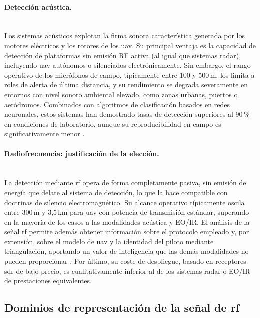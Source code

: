 \paragraph{Detección acústica.}\mbox{}\\[0.5em] Los sistemas acústicos explotan la firma sonora característica generada por los motores eléctricos y los rotores de los \gls{uav}. Su principal ventaja es la capacidad de detección de plataformas sin emisión RF activa (al igual que sistemas radar), incluyendo \gls{uav} autónomos o silenciados electrónicamente. Sin embargo, el rango operativo de los micrófonos de campo, típicamente entre 100 y 500\,m, los limita a roles de alerta de última distancia, y su rendimiento se degrada severamente en entornos con nivel sonoro ambiental elevado, como zonas urbanas, puertos o aeródromos. Combinados con algoritmos de clasificación basados en redes neuronales, estos sistemas han demostrado tasas de detección superiores al 90\,\% en condiciones de laboratorio, aunque su reproducibilidad en campo es significativamente menor \cite{he_multimodal_2025}.

\paragraph{Radiofrecuencia: justificación de la elección.}\mbox{}\\[0.5em]
La detección mediante \gls{rf} opera de forma completamente pasiva, sin emisión de energía que delate al sistema de detección, lo que la hace compatible con doctrinas de silencio electromagnético. Su alcance operativo típicamente oscila entre 300\,m y 3,5\,km para \gls{uav} con potencia de transmisión estándar, superando en la mayoría de los casos a las modalidades acústica y EO/IR. El análisis de la señal \gls{rf} permite además obtener información sobre el protocolo empleado y, por extensión, sobre el modelo de \gls{uav} y la identidad del piloto mediante triangulación, aportando un valor de inteligencia que las demás modalidades no pueden proporcionar \cite{ezuma_detection_2020, alam_rf-enabled_2023}. Por último, su coste de despliegue, basado en receptores \gls{sdr} de bajo precio, es cualitativamente inferior al de los sistemas radar o EO/IR de prestaciones equivalentes.

\subsection{Dominios de representación de la señal de \gls{rf}}
\label{subsec:representaciones_iq}

